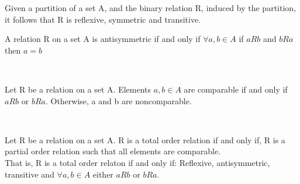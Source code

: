 \begin{theorm}
    Given a partition of a set A, and the binary relation R, induced by the partition, it follows that R is reflexive, symmetric and transitive.
\end{theorm}
\begin{definition}
    A relation R on a set A is antisymmetric if and only if \(\forall a, b \in A\) if \(aRb\) and \(bRa\) then \(a=b\)
\end{definition}\\
\begin{definition}
    Let R be a relation on a set A. Elements \(a, b\in A\) are comparable if and only if \(aRb\) or \(bRa\). Otherwise, a and b are noncomparable.
\end{definition}\\
\begin{definition}
    Let R be a relation on a set A. R is a total order relation if and only if, R is a partial order relation such that all elements are comparable.\\
    That is, R is a total order relaton if and only if: Reflexive, antisymmetric, transitive and \(\forall a, b \in A\) either \(aRb\) or \(bRa\).
\end{definition}\\
